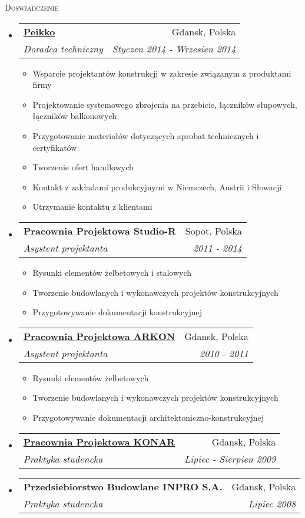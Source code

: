 \documentclass[letterpaper,11pt]{article}
\makeatletter
\newcommand{\resitem}[1]{\item #1 \vspace{-2pt}}
\newcommand{\ressubheading}[4]{
\begin{tabular*}{6.5in}{l@{\extracolsep{\fill}}r}
		\textbf{#1} & #2 \\
		\textit{#3} & \textit{#4} \\
\end{tabular*}\vspace{-6pt}}
\makeatother
\begin{document}
\begin{tcolorbox}
\textsc{Doswiadczenie}
\end{tcolorbox}
\begin{itemize}

\item
	\ressubheading{\href{www.peikko.pl}{Peikko}}{Gdansk, Polska}{Doradca techniczny}{Styczen 2014 - Wrzesien 2014}
	\begin{itemize}
      \resitem{Wsparcie projektantów konstrukcji w zakresie związanym z produktami firmy}
      \resitem{Projektowanie systemowego zbrojenia na przebicie, łączników słupowych, łączników balkonowych}
      \resitem{Przygotowanie materiałów dotyczących aprobat technicznych i certyfikatów}
      \resitem{Tworzenie ofert handlowych}
      \resitem{Kontakt z zakładami produkcyjnymi w Niemczech, Austrii i Słowacji}
      \resitem{Utrzymanie kontaktu z klientami}
	\end{itemize}

\item 
	\ressubheading{Pracownia Projektowa Studio-R}{Sopot, Polska}{Asystent projektanta}{2011 - 2014}
	\begin{itemize}
      \resitem{Rysunki elementów żelbetowych i stalowych}
      \resitem{Tworzenie budowlanych i wykonawczych projektów konstrukcyjnych}
      \resitem{Przygotowywanie dokumentacji konstrukcyjnej}
	\end{itemize}

\item
	\ressubheading{\href{http://www.konar.eu/}{Pracownia Projektowa ARKON}}{Gdansk, Polska}{Asystent projektanta}{2010 - 2011}
	\begin{itemize}
      \resitem{Rysunki elementów żelbetowych}
      \resitem{Tworzenie budowlanych i wykonawczych projektów konstrukcyjnych}
      \resitem{Przygotowywanie dokumentacji architektoniczno-konstrukcyjnej}
	\end{itemize}

\item
	\ressubheading{\href{http://www.konar.eu/}{Pracownia Projektowa KONAR}}{Gdansk, Polska}{Praktyka studencka}{Lipiec - Sierpien 2009}

\item
	\ressubheading{Przedsiebiorstwo Budowlane INPRO S.A.}{Gdansk, Polska}{Praktyka studencka}{Lipiec 2008}

\end{itemize}
\end{document}

